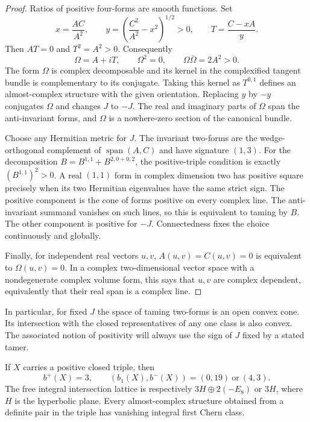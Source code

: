 \begin{proof}
Ratios of positive four-forms are smooth functions. Set
\begin{equation}\label{eq:pair-normalization}
 x=\frac{AC}{A^2},\qquad
 y=\left(\frac{C^2}{A^2}-x^2\right)^{1/2}>0,\qquad
 T=\frac{C-xA}{y}.
\end{equation}
Then $AT=0$ and $T^2=A^2>0$. Consequently
\[
 \Omega=A+iT,\qquad \Omega^2=0,\qquad
 \Omega\overline\Omega=2A^2>0.
\]
The form $\Omega$ is complex decomposable and its kernel in the
complexified tangent bundle is complementary to its conjugate. Taking
this kernel as $T^{0,1}$ defines an almost-complex structure with the
given orientation. Replacing $y$ by $-y$ conjugates $\Omega$ and changes
$J$ to $-J$. The real and imaginary parts of $\Omega$ span the
anti-invariant forms, and $\Omega$ is a nowhere-zero section of the
canonical bundle.

Choose any Hermitian metric for $J$. The invariant two-forms are the
wedge-orthogonal complement of $\operatorname{span}(A,C)$ and have
signature $(1,3)$. For the decomposition
$B=B^{1,1}+B^{2,0+0,2}$, the positive-triple condition is exactly
$(B^{1,1})^2>0$. A real $(1,1)$ form in complex dimension two has positive
square precisely when its two Hermitian eigenvalues have the same
strict sign. The positive component is the cone of forms positive on
every complex line. The anti-invariant summand vanishes on such lines,
so this is equivalent to taming by $B$. The other component is positive
for $-J$. Connectedness fixes the choice continuously and globally.

Finally, for independent real vectors $u,v$,
$A(u,v)=C(u,v)=0$ is equivalent to $\Omega(u,v)=0$.
In a complex two-dimensional vector space with a nondegenerate complex
volume form, this says that $u,v$ are complex dependent, equivalently
that their real span is a complex line.
\end{proof}

In particular, for fixed $J$ the space of taming two-forms is an open
convex cone. Its intersection with the closed representatives of any
one class is also convex. The associated notion of positivity will
always use the sign of $J$ fixed by a stated tamer.

\begin{proposition}\label{prop:topology}
If $X$ carries a positive closed triple, then
\[
 b^+(X)=3,\qquad
 (b_1(X),b^-(X))=(0,19)\ \text{or}\ (4,3).
\]
The free integral intersection lattice is respectively
$3H\oplus2(-E_8)$ or $3H$, where $H$ is the hyperbolic plane.
Every almost-complex structure obtained from a definite pair in the
triple has vanishing integral first Chern class.
\end{proposition}

